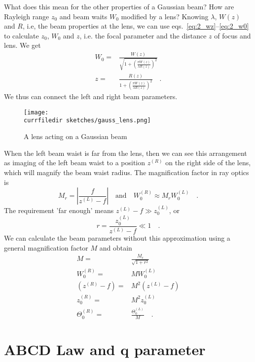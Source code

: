 What does this mean for the other properties of a Gaussian beam? How are Rayleigh range $z_0$ and beam waits $W_0$ modified by a lens? Knowing $\lambda$, $W(z)$ and $R$, i.e, the beam properties at the lens, we can use eqs.~\ref{eq:2_wz}--\ref{eq:2_w0}  to calculate $z_0$, $W_0$ and $z$, i.e. the focal parameter and the distance $z$ of focus and lens. We get
\begin{align}
    W_0 = & \frac{W(z)}{\sqrt{1 + \left(\frac{\pi W(z)}{ \lambda R(z)} \right)^2}} \\
    z = & \frac{R(z)}{1 + \left(\frac{\pi W(z)}{ \lambda R(z)} \right)^2} \quad .
\end{align}
We thus can connect the left and right beam parameters.



\begin{figure}
    \texttt{[image: \\currfiledir sketches/gauss\_lens.png]}
   \caption{A lens acting on a Gaussian beam}
\end{figure}


When the left beam waist is far from the lens, then we can see this arrangement as imaging of the left beam waist to a position $z^{(R)}$ on the right side  of the lens, which will magnify the beam waist radius. The magnification factor in ray optics is 
\begin{equation}
    M_r = \left| \frac{f}{z^{(L)} -f}  \right| \quad \text{and} \quad W_0^{(R)} \approx M_r W_0^{(L)}  \quad .
\end{equation}
The requirement 'far enough' means $z^{(L)} - f \gg z_0^{(L)} $, or
\begin{equation}
    r = \frac{z_0^{(L)} }{z^{(L)}  - f} \ll 1 \quad .
\end{equation}
We can calculate the beam parameters without  this approximation using a general magnification factor $M$ and obtain
\begin{align}
    M = & \frac{M_r}{\sqrt{1 + r^2}} \\
    W_0^{(R)}  = & M W_0^{(L)}  \\
    (z^{(R)} - f) = &M^2 (z^{(L)} -f) \\
    z_0^{(R)} = & M^2 z_0^{(L)}  \\
    \Theta_0^{(R)} = & \frac{\Theta_0^{(L)} }{M} \quad .
\end{align}

\section{ABCD Law and q parameter}

